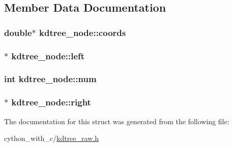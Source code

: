 \subsection{Member Data Documentation}
\hypertarget{structkdtree__node_af9d6e47a477977efc10800b445eea090}{
\subsubsection[{coords}]{\setlength{\rightskip}{0pt plus 5cm}double$\ast$ {\bf kdtree\_\-node::coords}}}
\label{structkdtree__node_af9d6e47a477977efc10800b445eea090}
\hypertarget{structkdtree__node_a2c1ec29109a9360a437aa18c4dc2a2a3}{
\subsubsection[{left}]{$\ast$ {\bf kdtree\_\-node::left}}}
\label{structkdtree__node_a2c1ec29109a9360a437aa18c4dc2a2a3}
\hypertarget{structkdtree__node_a6ebf3daf8c8d9c6786bba91e3feceaf4}{
\subsubsection[{num}]{\setlength{\rightskip}{0pt plus 5cm}int {\bf kdtree\_\-node::num}}}
\label{structkdtree__node_a6ebf3daf8c8d9c6786bba91e3feceaf4}
\hypertarget{structkdtree__node_adab509b4b43648703b9938bca292df52}{
\subsubsection[{right}]{$\ast$ {\bf kdtree\_\-node::right}}}
\label{structkdtree__node_adab509b4b43648703b9938bca292df52}


The documentation for this struct was generated from the following file:\begin{DoxyCompactItemize}
\item 
cython\_\-with\_\-c/\hyperlink{kdtree__raw_8h}{kdtree\_\-raw.h}\end{DoxyCompactItemize}
